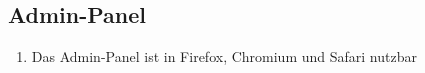 \subsection{Admin-Panel}

\begin{enumerate}
    \item Das Admin-Panel ist in Firefox, Chromium und Safari nutzbar
\end{enumerate}